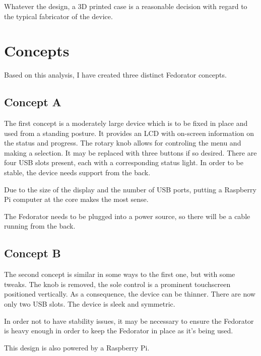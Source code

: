         Whatever the design, a 3D printed case is a reasonable decision with regard to the typical fabricator of the device.
        
    \section{Concepts}
        Based on this analysis, I have created three distinct Fedorator concepts.
        \pagebreak
        \subsection{Concept A}
            The first concept is a moderately large device which is to be fixed in place and used from a standing posture.  It provides an LCD with on-screen information on the status and progress.  The rotary knob allows for controling the menu and making a selection.  It may be replaced with three buttons if so desired.  There are four USB slots present, each with a corresponding status light.  In order to be stable, the device needs support from the back.
            
            Due to the size of the display and the number of USB ports, putting a Raspberry Pi computer at the core makes the most sense.
            
            The Fedorator needs to be plugged into a power source, so there will be a cable running from the back.
            \newpage
        
        \subsection{Concept B}
            The second concept is similar in some ways to the first one, but with some tweaks.  The knob is removed, the sole control is a prominent touchscreen positioned vertically.  As a consequence, the device can be thinner.  There are now only two USB slots.  The device is sleek and symmetric.
            
            In order not to have stability issues, it may be necessary to ensure the Fedorator is heavy enough in order to keep the Fedorator in place as it's being used.
            
            This design is also powered by a Raspberry Pi.
            \newpage
        
